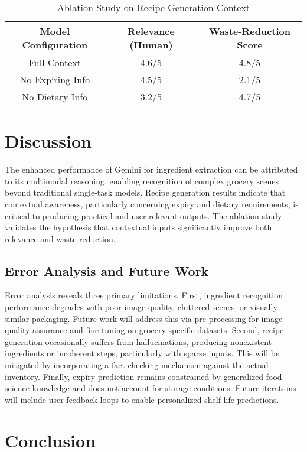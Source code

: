 \documentclass[conference]{IEEEtran}
\begin{document}
\begin{table}[h]
  \centering
  \caption{Ablation Study on Recipe Generation Context}
  \label{tab:ablation}
  \begin{tabular}{|c|c|c|}
    \hline
    \textbf{Model Configuration} & \textbf{Relevance (Human)} & \textbf{Waste-Reduction Score} \\
    \hline
    Full Context & 4.6/5 & 4.8/5 \\
    No Expiring Info & 4.5/5 & 2.1/5 \\
    No Dietary Info & 3.2/5 & 4.7/5 \\
    \hline
  \end{tabular}
\end{table}

\section{Discussion}

The enhanced performance of Gemini for ingredient extraction can be attributed to its multimodal reasoning, enabling recognition of complex grocery scenes beyond traditional single-task models. Recipe generation results indicate that contextual awareness, particularly concerning expiry and dietary requirements, is critical to producing practical and user-relevant outputs. The ablation study validates the hypothesis that contextual inputs significantly improve both relevance and waste reduction.

\subsection{Error Analysis and Future Work}

Error analysis reveals three primary limitations. First, ingredient recognition performance degrades with poor image quality, cluttered scenes, or visually similar packaging. Future work will address this via pre-processing for image quality assurance and fine-tuning on grocery-specific datasets. Second, recipe generation occasionally suffers from hallucinations, producing nonexistent ingredients or incoherent steps, particularly with sparse inputs. This will be mitigated by incorporating a fact-checking mechanism against the actual inventory. Finally, expiry prediction remains constrained by generalized food science knowledge and does not account for storage conditions. Future iterations will include user feedback loops to enable personalized shelf-life predictions.

\section{Conclusion}
\end{document}
